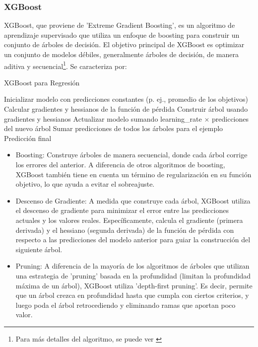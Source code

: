 \documentclass[12pt]{article}
\begin{document}
\subsubsection{XGBoost}

XGBoost, que proviene de 'Extreme Gradient Boosting', es un algoritmo de aprendizaje supervisado que utiliza un enfoque de boosting para construir un conjunto de árboles de decisión. El objetivo principal de XGBoost es optimizar un conjunto de modelos débiles, generalmente árboles de decisión, de manera aditiva y secuencial\footnote{Para más detalles del algoritmo, se puede ver \cite{xgboost}}. Se caracteriza por:

\begin{algorithm}
\caption{XGBoost para Regresión}
\begin{algorithmic}
    \State Inicializar modelo con predicciones constantes (p. ej., promedio de los objetivos)
        \State Calcular gradientes y hessianos de la función de pérdida
        \State Construir árbol usando gradientes y hessianos
        \State Actualizar modelo sumando learning\_rate $\times$ predicciones del nuevo árbol
    \EndFor
        \State Sumar predicciones de todos los árboles para el ejemplo 
        \State \Return Predicción final
    \EndProcedure
\EndProcedure
\end{algorithmic}
\end{algorithm}


\begin{itemize}
  \item Boosting: Construye árboles de manera secuencial, donde cada árbol corrige los errores del anterior. A diferencia de otros algoritmos de boosting, XGBoost también tiene en cuenta un término de regularización en su función objetivo, lo que ayuda a evitar el sobreajuste.
  \item Descenso de Gradiente: A medida que construye cada árbol, XGBoost utiliza el descenso de gradiente para minimizar el error entre las predicciones actuales y los valores reales. Específicamente, calcula el gradiente (primera derivada) y el hessiano (segunda derivada) de la función de pérdida con respecto a las predicciones del modelo anterior para guiar la construcción del siguiente árbol.
  \item Pruning: A diferencia de la mayoría de los algoritmos de árboles que utilizan una estrategia de 'pruning' basada en la profundidad (limitan la profundidad máxima de un árbol), XGBoost utiliza 'depth-first pruning'. Es decir, permite que un árbol crezca en profundidad hasta que cumpla con ciertos criterios, y luego poda el árbol retrocediendo y eliminando ramas que aportan poco valor.
\end{itemize}
\end{document}
